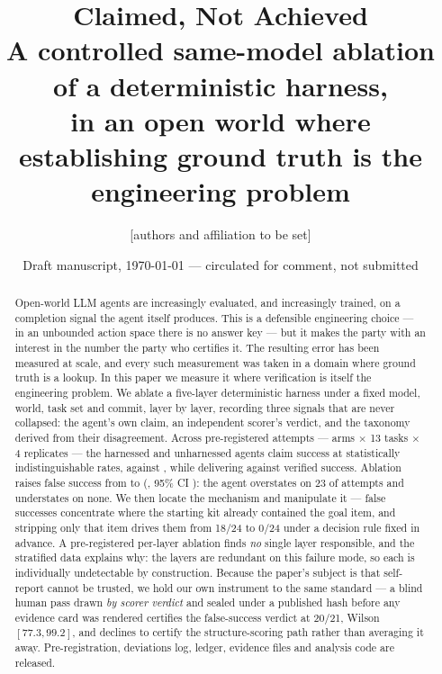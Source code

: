 \documentclass[11pt]{article}
\title{\textbf{Claimed, Not Achieved}\\[.35em]
  \large A controlled same-model ablation of a deterministic harness,\\
  \large in an open world where establishing ground truth is the
  engineering problem}
\author{\textcolor{falsecol}{[authors and affiliation to be set]}}
\date{Draft manuscript, \today{} --- circulated for comment, not submitted}
\begin{document}
\maketitle

\begin{abstract}
\noindent
Open-world LLM agents are increasingly evaluated, and increasingly
trained, on a completion signal the agent itself produces. This is a
defensible engineering choice --- in an unbounded action space there is
no answer key --- but it makes the party with an interest in the number
the party who certifies it. The resulting error has been measured at
scale, and every such measurement was taken in a domain where ground
truth is a lookup. In this paper we measure it where verification is
itself the engineering problem. We ablate a five-layer deterministic
harness under a fixed model, world, task set and commit, layer by layer,
recording three signals that are never collapsed: the agent's own claim,
an independent scorer's verdict, and the taxonomy derived from their
disagreement. Across \NPrimary{} pre-registered attempts --- \NArms{}
arms $\times$ 13 tasks $\times$ 4 replicates --- the harnessed and
unharnessed agents claim success at statistically indistinguishable
rates, \OnClaim{} against \OffClaim{}, while delivering \OnSucc{}
against \OffSucc{} verified success. Ablation raises false success from
\OnFC{} to \OffFC{} (\FCDiff{}, 95\% CI \FCCI{}): the agent overstates
on 23 of \OffN{} attempts and understates on none. We then locate the
mechanism and manipulate it --- false successes concentrate where the
starting kit already contained the goal item, and stripping only that
item drives them from 18/24 to 0/24 under a decision rule fixed in
advance. A pre-registered per-layer ablation finds \emph{no} single
layer responsible, and the stratified data explains why: the layers are
redundant on this failure mode, so each is individually undetectable by
construction. Because the paper's subject is that self-report cannot be
trusted, we hold our own instrument to the same standard --- a blind
human pass drawn \emph{by scorer verdict} and sealed under a published
hash before any evidence card was rendered certifies the false-success
verdict at 20/21, Wilson $[77.3, 99.2]$, and declines to certify the
structure-scoring path rather than averaging it away. Pre-registration,
deviations log, ledger, evidence files and analysis code are released.
\end{abstract}
\end{document}
